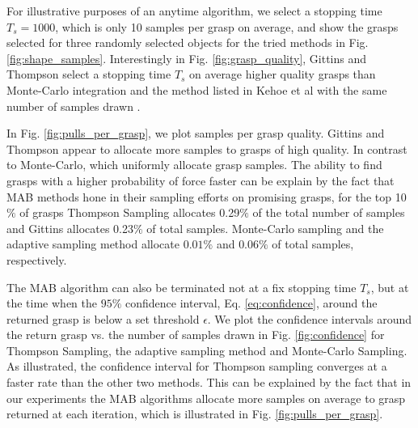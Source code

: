 \documentclass[10pt, conference]{ieeeconf}      %
\begin{document}
 For illustrative purposes of an anytime algorithm,  we select a stopping time $T_s=1000$, which is only 10 samples per grasp on average, and show the grasps selected for three randomly selected objects for the tried methods in Fig. \ref{fig:shape_samples}. Interestingly in Fig. \ref{fig:grasp_quality}, Gittins and Thompson select a stopping time $T_s$ on average higher quality grasps than Monte-Carlo integration and the method listed in Kehoe et al \cite{kehoe2012toward} with the same number of samples drawn .

 In Fig. \ref{fig:pulls_per_grasp}, we plot samples per grasp quality. Gittins and Thompson appear to allocate  more samples to grasps of high quality. In contrast to Monte-Carlo, which uniformly allocate grasp samples. The ability to find grasps with a higher probability of force  faster can be explain by the fact that MAB methods hone in their sampling efforts on promising grasps, for the top 10$\%$ of grasps Thompson Sampling allocates 0.29$\%$ of the total number of samples and Gittins allocates 0.23$\%$ of total samples. Monte-Carlo sampling and the adaptive sampling method allocate $0.01\%$  and $0.06\%$ of total samples, respectively. 
 
 
 The MAB algorithm can also be terminated not at a fix stopping time $T_s$, but at the time when the $95\%$ confidence interval, Eq. \ref{eq:confidence}, around the returned grasp is below a set threshold $\epsilon$. We plot the confidence intervals around the return grasp vs. the number of samples drawn in Fig. \ref{fig:confidence} for Thompson Sampling, the adaptive sampling method\cite{kehoe2012toward} and Monte-Carlo Sampling.  As illustrated, the confidence interval for Thompson sampling converges at a faster rate than the other two methods. This can be explained by the fact that in our experiments the MAB algorithms allocate more samples on average to grasp returned at each iteration, which is illustrated in Fig. \ref{fig:pulls_per_grasp}. 
\end{document}
